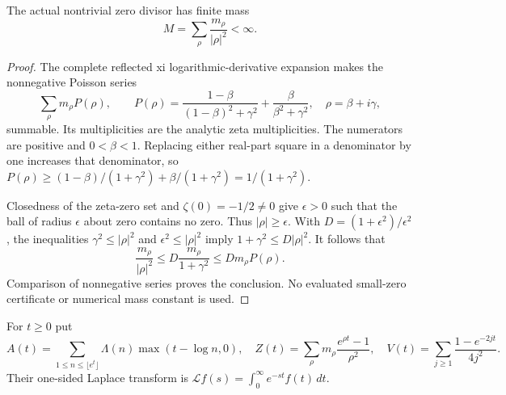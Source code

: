 \begin{lemma}
\label{analytic:inverse-square-mass}
\leanok
The actual nontrivial zero divisor has finite mass
\[
 M=\sum_\rho\frac{m_\rho}{|\rho|^2}<\infty.
\]
\end{lemma}
\begin{proof}
The complete reflected xi logarithmic-derivative expansion makes
the nonnegative Poisson series
\[
 \sum_\rho m_\rho P(\rho),\qquad
 P(\rho)=\frac{1-\beta}{(1-\beta)^2+\gamma^2}
             +\frac{\beta}{\beta^2+\gamma^2},
 \quad \rho=\beta+i\gamma,
\]
summable.  Its multiplicities are the analytic zeta multiplicities.
The numerators are positive and $0<\beta<1$.
Replacing either real-part square in a denominator by one increases
that denominator, so
$P(\rho)\ge(1-\beta)/(1+\gamma^2)+\beta/(1+\gamma^2)
=1/(1+\gamma^2)$.

Closedness of the zeta-zero set and $\zeta(0)=-1/2\ne0$ give
$\epsilon>0$ such that the ball of radius $\epsilon$ about zero
contains no zero.  Thus $|\rho|\ge\epsilon$.
With $D=(1+\epsilon^2)/\epsilon^2$, the inequalities
$\gamma^2\le|\rho|^2$ and $\epsilon^2\le|\rho|^2$ imply
$1+\gamma^2\le D|\rho|^2$.
It follows that
\[
 \frac{m_\rho}{|\rho|^2}
 \le D\frac{m_\rho}{1+\gamma^2}\le Dm_\rho P(\rho).
\]
Comparison of nonnegative series proves the conclusion.
No evaluated small-zero certificate or numerical mass constant
is used.
\end{proof}

\begin{definition}
\label{analytic:log-primitives}
\leanok
For $t\ge0$ put
\[
 A(t)=\sum_{1\le n\le\lfloor e^t\rfloor}
           \Lambda(n)\max(t-\log n,0),
\quad
 Z(t)=\sum_\rho m_\rho\frac{e^{\rho t}-1}{\rho^2},
\quad
 V(t)=\sum_{j\ge1}\frac{1-e^{-2jt}}{4j^2}.
\]
Their one-sided Laplace transform is
$\mathcal Lf(s)=\int_0^\infty e^{-st}f(t)\,dt$.
\end{definition}

